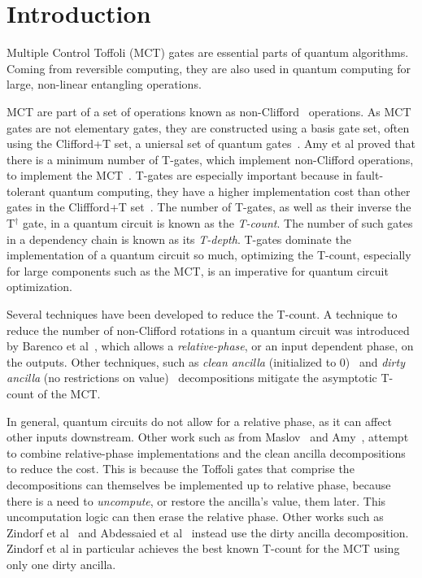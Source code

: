 \section{Introduction}
\label{Intro}

Multiple Control Toffoli (MCT) gates are essential parts of quantum algorithms. Coming from
reversible computing, they are also used in quantum computing for large, non-linear
entangling operations.

MCT are part of a set of operations known as non-Clifford~\cite{bib-barenco-elementary}
operations. As MCT gates are not elementary gates, they are constructed using a basis gate set,
often using the Clifford+T set, a uniersal set of quantum gates~\cite{bib-bravyi2005universal}.
Amy et al proved that there is a minimum number of T-gates,
which implement non-Clifford operations, to implement the MCT~\cite{amy-meet-in-middle}.
T-gates are especially important because in fault-tolerant quantum computing, they have a
higher implementation cost than other gates in the Cliffford+T set~\cite{bib-bravyi2005universal}.
The number of T-gates, as well as their inverse the T$^{\dagger}$ gate, in a quantum
circuit is known as the \emph{T-count}. The number of such gates in a dependency chain is known
as its \emph{T-depth}. T-gates dominate the implementation of a quantum
circuit so much, optimizing the T-count, especially for large components such as the MCT, is
an imperative for quantum circuit optimization.

Several techniques have been developed to reduce the T-count. A technique to reduce the number
of non-Clifford rotations in a quantum circuit was introduced by Barenco et al~\cite{bib-barenco-elementary},
which allows a \emph{relative-phase}, or an input dependent phase, on the outputs. Other techniques,
such as \emph{clean ancilla} (initialized to 0)~\cite{bib-mike-and-ike} and \emph{dirty ancilla}
(no restrictions on value)~\cite{bib-barenco-elementary} decompositions mitigate the asymptotic T-count
of the MCT.

In general, quantum circuits do not allow for a relative phase, as it can affect other inputs downstream.
Other work such as from Maslov~\cite{bib-maslov-rtof} and Amy~\cite{bib-amy-phase-state}, attempt
to combine relative-phase implementations and the clean ancilla decompositions to reduce the cost.
This is because the Toffoli gates that comprise the decompositions can themselves be implemented
up to relative phase, because there is a need to \emph{uncompute}, or restore the ancilla's value,
them later. This uncomputation logic can then erase the relative phase. Other works such
as Zindorf et al~\cite{bib-zindorf-mct} and Abdessaied et al~\cite{bib-abdessaied-mct} instead use
the dirty ancilla decomposition. Zindorf et al in particular achieves the best known T-count for
the MCT using only one dirty ancilla. 

